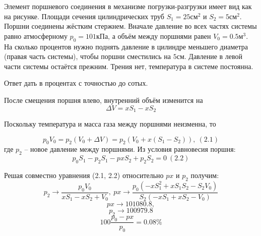 
Элемент поршневого соединения в механизме погрузки-разгрузки имеет вид как на рисунке. 
Площади сечения цилиндрических труб $  S_1 = 25 \text{см}^2 $ и $ S_2 = 5 \text{см}^2 $. 
Поршни соединены жёстким стержнем. Вначале давление во всех частях системы равно атмосферному 
$ p_0 = 101 \text{кПа} $, а объём между поршнями равен $ V_0=0.5\text{м}^3 $. 
На сколько процентов нужно поднять давление в цилиндре меньшего диаметра 
(правая часть системы), чтобы поршни сместились на $ 5\text{см} $. Давление в левой 
части системы остаётся прежним. Трения нет, температура в системе постоянна.


Ответ дать в процентах с точностью до сотых.

\solutionSection

После смещения поршня влево, внутренний объём изменится на
$$\Delta V=xS_1-xS_2$$

Поскольку температура и масса газа между поршнями неизменна, 
то 

$$p_0 V_0=p_2 (V_0+\Delta V)=p_2 (V_0+x(S_1-S_2)), \: (2.1)$$
где $p_2$ – новое давление между поршнями. Из условия равновесия поршня:
$$p_0 S_1-p_2 S_1-px S_2+p_2 S_2=0 \:(2.2)$$

Решая совместно уравнения (2.1, 2.2) относительно $px$ и $p_2$ получим:
$$p_2 \rightarrow \frac{p_0 V_0}{xS_1-xS_2+V_0}, \: px \rightarrow \frac{p_0 (-xS_1^2+xS_1 S_2-S_2 V_0)}{S_2 (-xS_1+xS_2-V_0)}$$
$$px\rightarrow 101080.8,$$
$$p_2\rightarrow 100979.8$$
$$100 \frac{p_0-px}{p_0} =0.08\%$$

